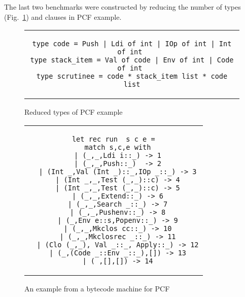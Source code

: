 The last two benchmarks were constructed by reducing the number of types (Fig.~\ref{fig:pcf-reduced}) and clauses in PCF example.%
\begin{figure}%
\centering
\begin{tabular}{c} %
\begin{lstlisting}
type code = Push | Ldi of int | IOp of int | Int of int 
type stack_item = Val of code | Env of int | Code of int 
type scrutinee = code * stack_item list * code list
\end{lstlisting}
\end{tabular}
\caption{Reduced types of PCF example }
\label{fig:pcf-reduced}
\end{figure}

\begin{figure}%
\centering
\begin{tabular}{c} %
\begin{lstlisting}
let rec run  s c e =
  match s,c,e with
  | (_,_,Ldi i::_) -> 1
  | (_,_,Push::_)  -> 2
  | (Int _,Val (Int _)::_,IOp _::_) -> 3
  | (Int _,_,Test (_,_)::c) -> 4
  | (Int _,_,Test (_,_)::c) -> 5
  | (_,_,Extend::_) -> 6
  | (_,_,Search _::_) -> 7
  | (_,_,Pushenv::_) -> 8
  | (_,Env e::s,Popenv::_) -> 9
  | (_,_,Mkclos cc::_) -> 10
  | (_,_,Mkclosrec _::_) -> 11
  | (Clo (_,_), Val _::_, Apply::_) -> 12
  | (_,(Code _::Env _::_),[]) -> 13
  | (_,[],[]) -> 14
\end{lstlisting}
\end{tabular}
\caption{An example from a bytecode machine for PCF}
\label{fig:pcf}
\end{figure}

